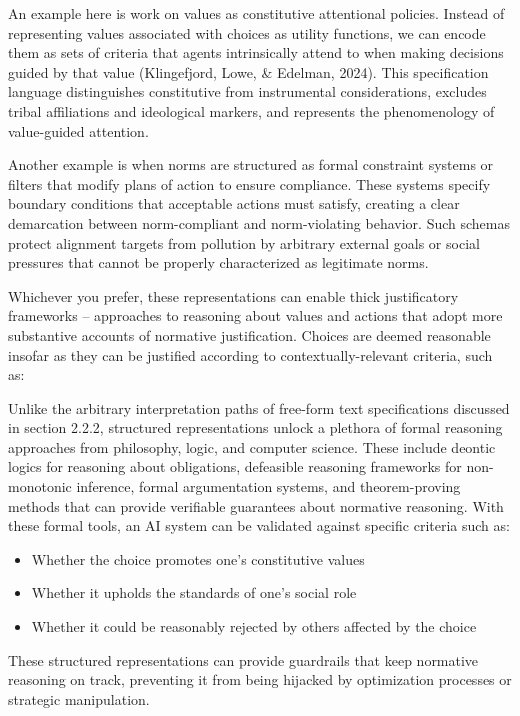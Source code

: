 An example here is work on values as constitutive attentional policies. Instead of representing values associated with choices as utility functions, we can encode them as sets of criteria that agents intrinsically attend to when making decisions guided by that value (Klingefjord, Lowe, \& Edelman, 2024). This specification language distinguishes constitutive from instrumental considerations, excludes tribal affiliations and ideological markers, and represents the phenomenology of value-guided attention.

Another example is when norms are structured as formal constraint systems or filters that modify plans of action to ensure compliance. These systems specify boundary conditions that acceptable actions must satisfy, creating a clear demarcation between norm-compliant and norm-violating behavior. Such schemas protect alignment targets from pollution by arbitrary external goals or social pressures that cannot be properly characterized as legitimate norms.

Whichever you prefer, these representations can enable thick justificatory frameworks -- approaches to reasoning about values and actions that adopt more substantive accounts of normative justification. Choices are deemed reasonable insofar as they can be justified according to contextually-relevant criteria, such as:

Unlike the arbitrary interpretation paths of free-form text specifications discussed in section 2.2.2, structured representations unlock a plethora of formal reasoning approaches from philosophy, logic, and computer science. These include deontic logics for reasoning about obligations, defeasible reasoning frameworks for non-monotonic inference, formal argumentation systems, and theorem-proving methods that can provide verifiable guarantees about normative reasoning. With these formal tools, an AI system can be validated against specific criteria such as:

\begin{itemize}
\item Whether the choice promotes one's constitutive values
\item Whether it upholds the standards of one's social role
\item Whether it could be reasonably rejected by others affected by the choice
\end{itemize}

These structured representations can provide guardrails that keep normative reasoning on track, preventing it from being hijacked by optimization processes or strategic manipulation.

